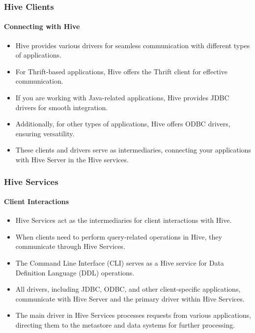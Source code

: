 \begin{frame}
\frametitle{Hive Clients}
	\framesubtitle{Connecting with Hive}
	
	\begin{itemize}
	  \item Hive provides various drivers for seamless communication with different types of applications.
	  \item For Thrift-based applications, Hive offers the Thrift client for effective communication.
	  \item If you are working with Java-related applications, Hive provides JDBC drivers for smooth integration.
	  \item Additionally, for other types of applications, Hive offers ODBC drivers, ensuring versatility.
	  \item These clients and drivers serve as intermediaries, connecting your applications with Hive Server in the Hive services.
	\end{itemize}
	
	\end{frame}
\begin{frame}
	\frametitle{Hive Services}
	\framesubtitle{Client Interactions}
	
	\begin{itemize}
	  \item Hive Services act as the intermediaries for client interactions with Hive.
	  \item When clients need to perform query-related operations in Hive, they communicate through Hive Services.
	  \item The Command Line Interface (CLI) serves as a Hive service for Data Definition Language (DDL) operations.
	  \item All drivers, including JDBC, ODBC, and other client-specific applications, communicate with Hive Server and the primary driver within Hive Services.
	  \item The main driver in Hive Services processes requests from various applications, directing them to the metastore and data systems for further processing.
	\end{itemize}
	
	\end{frame}

